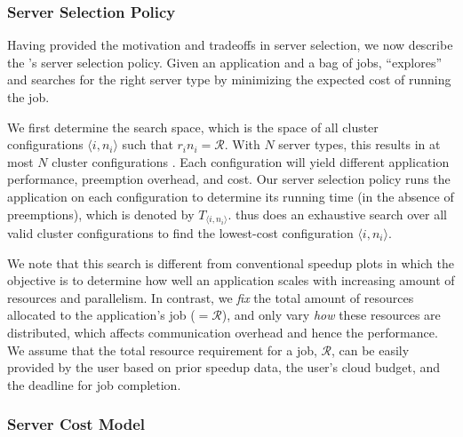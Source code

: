 \subsubsection{Server Selection Policy}

Having provided the motivation and tradeoffs in server selection, we now describe the \sysname's server selection policy. 
Given an application and a bag of jobs, \sysname ``explores'' and searches for the right server type by minimizing the expected cost of running the job. 

We first determine the search space, which is the space of all cluster configurations $\langle i,n_i \rangle$  such that $r_i n_i = \mathcal{R}$.  With $N$ server types, this results in at most $N$ cluster configurations .
Each configuration will yield different application performance, preemption overhead, and cost.
Our server selection policy runs the application on each configuration to determine its running time (in the absence of preemptions), which is denoted by $T_{\langle i,n_i \rangle}$. 
\sysname thus does an exhaustive search over all valid cluster configurations to find the lowest-cost configuration $\langle i, n_i \rangle$. 

We note that this search is different from conventional speedup plots in which the objective is to determine how well an application scales with increasing amount of resources and parallelism. 
In contrast, we \emph{fix} the total amount of resources allocated to the application's job ($=\mathcal{R}$), and only vary \emph{how} these resources are distributed, which affects communication overhead and hence the performance.
We assume that the total resource requirement for a job, $\mathcal{R}$, can be easily provided by the user based on prior speedup data, the user's cloud budget, and the deadline for job completion. 



\subsubsection{Server Cost Model}
\label{subsec:cost-model}

